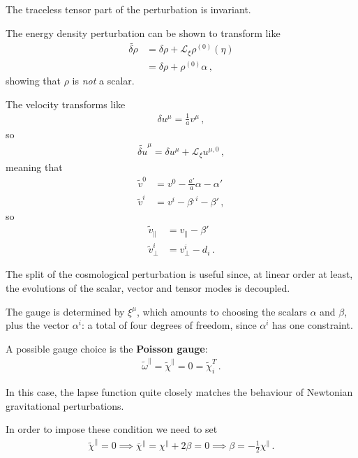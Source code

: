 \documentclass[main.tex]{subfiles}
\begin{document}
The traceless tensor part of the perturbation is invariant. 

The energy density perturbation can be shown to transform like 
%
\begin{align}
\widetilde{\delta \rho } &= \delta \rho + \mathscr{L}_\xi \rho^{(0)} (\eta ) \\ 
&= \delta \rho + \rho^{(0)} \alpha 
\,,
\end{align}
%
showing that \(\rho \) is \emph{not} a scalar.
 
The velocity transforms like 
%
\begin{align}
\delta u^{\mu } = \frac{1}{a} v^{\mu } 
\,,
\end{align}
%
so 
%
\begin{align}
\widetilde{\delta u}^{\mu } = \delta u^{\mu } + \mathscr{L}_\xi u^{\mu , 0}
\,,
\end{align}
%
meaning that 
%
\begin{align}
\widetilde{v}^{0} &= v^{0} - \frac{a'}{a} \alpha - \alpha '  \\
\widetilde{v}^{i} &= v^{i} - \beta^{, i} - \beta '
\,,
\end{align}
%
so 
%
\begin{align}
\widetilde{v}_\parallel &= v_\parallel - \beta '  \\
\widetilde{v}^{i}_{\perp} &= v^{i}_\perp - d_i
\,.
\end{align}

The split of the cosmological perturbation is useful since, at linear order at least, the evolutions of the scalar, vector and tensor modes is decoupled.

The gauge is determined by \(\xi^{\mu }\), which amounts to choosing the scalars \(\alpha \) and \(\beta \), plus the vector \(\alpha^{i} \): a total of four degrees of freedom, since \(\alpha^{i} \) has one constraint. 

A possible gauge choice is the \textbf{Poisson gauge}: 
%
\begin{align}
\widetilde{\omega}^{\parallel} = \widetilde{\chi}^{\parallel} = 0 = \widetilde{\chi}^{T}_i 
\,.
\end{align}

In this case, the lapse function quite closely matches the behaviour of Newtonian gravitational perturbations. 

In order to impose these condition we need to set
%
\begin{align}
\widetilde{\chi}^{\parallel} =0 \implies \overline{\chi}^{\parallel} = \chi^{\parallel} + 2 \beta = 0 \implies \beta = - \frac{1}{2} \chi^{\parallel}
\,.
\end{align}
%
\end{document}
